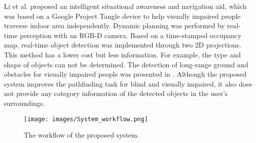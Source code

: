 \documentclass{ieeeaccess}
\begin{document}
Li et al. \cite{vision_based_mobile_indoor_nav_BingLi_2019} proposed an intelligent situational awareness and navigation aid, which was based on a Google Project Tangle device to help visually impaired people traverse indoor area independently. Dynamic planning was performed by real-time perception with an RGB-D camera. Based on a time-stamped occupancy map, real-time object detection was implemented through two 2D projections. This method has a lower cost but less information. For example, the type and shape of objects can not be determined. The detection of long-range ground and obstacles for visually impaired people was presented in \cite{yang2018long}. Although the proposed system improves the pathfinding task for blind and visually impaired, it also does not provide any category information of the detected objects in the user’s surroundings.

 \begin{figure}[b]
    \centering
    \texttt{[image: images/System\_workflow.png]}
    \caption{The workflow of the proposed system.}
    \label{fig:System_workflow}
\end{figure}
\end{document}
